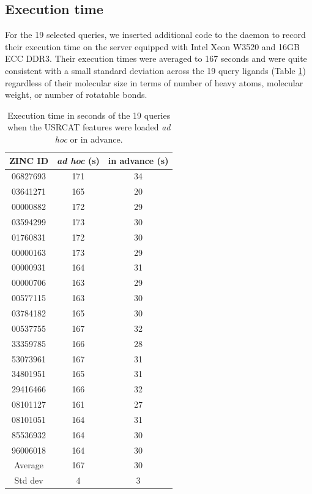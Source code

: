\subsection{Execution time}

For the 19 selected queries, we inserted additional code to the daemon to record their execution time on the server equipped with Intel Xeon W3520 and 16GB ECC DDR3. Their execution times were averaged to 167 seconds and were quite consistent with a small standard deviation across the 19 query ligands (Table \ref{usr:ExecutionTime}) regardless of their molecular size in terms of number of heavy atoms, molecular weight, or number of rotatable bonds.

\begin{table}
\caption{Execution time in seconds of the 19 queries when the USRCAT features were loaded \textit{ad hoc} or in advance.}
\label{usr:ExecutionTime}
\begin{tabular}{ccc}
\hline
ZINC ID  & \textit{ad hoc} (s) & in advance (s)\\
\hline
06827693 & 171 & 34\\
03641271 & 165 & 20\\
00000882 & 172 & 29\\
03594299 & 173 & 30\\
01760831 & 172 & 30\\
00000163 & 173 & 29\\
00000931 & 164 & 31\\
00000706 & 163 & 29\\
00577115 & 163 & 30\\
03784182 & 165 & 30\\
00537755 & 167 & 32\\
33359785 & 166 & 28\\
53073961 & 167 & 31\\
34801951 & 165 & 31\\
29416466 & 166 & 32\\
08101127 & 161 & 27\\
08101051 & 164 & 31\\
85536932 & 164 & 30\\
96006018 & 164 & 30\\
\hline
 Average & 167 & 30\\
 Std dev &   4 &  3\\
\hline
\end{tabular}
\end{table}

